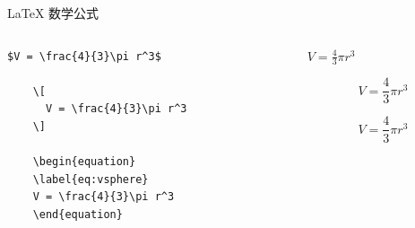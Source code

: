         
    \begin{frame}[fragile]{\LaTeX{} 数学公式}
    
    \begin{columns}
    \begin{column}{.5\textwidth}
    \lstset{language=[LaTeX]TeX}
    \begin{lstlisting}[basicstyle=\ttfamily\small]
    $V = \frac{4}{3}\pi r^3$
    
    \[
      V = \frac{4}{3}\pi r^3
    \]
    
    \begin{equation}
    \label{eq:vsphere}
    V = \frac{4}{3}\pi r^3
    \end{equation}
    \end{lstlisting}
    \end{column}
    
    \begin{column}{.5\textwidth}
    $V = \frac{4}{3}\pi r^3$
    
    \[
      V = \frac{4}{3}\pi r^3
    \]
    
    \begin{equation}
    \label{eq:vsphere}
    V = \frac{4}{3}\pi r^3
    \end{equation}
    \end{column}
    \end{columns}
    
    \end{frame}

    
